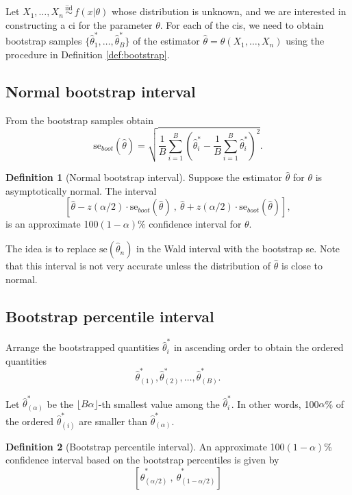 \documentclass[
]{book}
\newcommand{\iid}{\,\overset{\text{iid}}{\sim}\,}
\theoremstyle{definition}
\newtheorem{definition}{Definition}[chapter]
\theoremstyle{definition}
\theoremstyle{definition}
\theoremstyle{definition}
\theoremstyle{remark}
\begin{document}
Let \(X_1,\dots,X_n\iid f(x|\theta)\) whose distribution is unknown, and we are interested in constructing a ci for the parameter \(\theta\).
For each of the cis, we need to obtain bootstrap samples \(\{\hat\theta^*_1,\dots,\hat\theta^*_B\}\) of the estimator \(\hat\theta=\theta(X_1,\dots,X_n)\) using the procedure in Definition \ref{def:bootstrap}.

\hypertarget{normal-bootstrap-interval}{%
\subsection{Normal bootstrap interval}\label{normal-bootstrap-interval}}

From the bootstrap samples obtain
\[
\text{se}_{boot}(\hat\theta) = \sqrt{\frac{1}{B} \sum_{i=1}^B \left(\hat\theta^*_i - \frac{1}{B}\sum_{i=1}^B \hat\theta^*_i \right)^2}.
\]

\begin{definition}[Normal bootstrap interval]
Suppose the estimator \(\hat\theta\) for \(\theta\) is asymptotically normal.
The interval
\[
\left[\hat\theta - z(\alpha/2)\cdot \text{se}_{boot}(\hat\theta) \ , \  \hat\theta + z(\alpha/2)\cdot  \text{se}_{boot}(\hat\theta) \right],
\]
is an approximate 100\((1-\alpha)\)\% confidence interval for \(\theta\).
\end{definition}

The idea is to replace \(\text{se}(\hat\theta_n)\) in the Wald interval with the bootstrap se. Note that this interval is not very accurate unless the distribution of \(\hat\theta\) is close to normal.

\hypertarget{bootstrap-percentile-interval}{%
\subsection{Bootstrap percentile interval}\label{bootstrap-percentile-interval}}

Arrange the bootstrapped quantities \(\hat\theta_i^*\) in ascending order to obtain the ordered quantities
\[
\hat\theta_{(1)}^*, \hat\theta_{(2)}^*, \dots, \hat\theta_{(B)}^*.
\]

Let \(\hat\theta^*_{(\alpha)}\) be the \(\lfloor B\alpha \rfloor\)-th smallest value among the \(\hat\theta_i^*\). In other words, 100\(\alpha\)\% of the ordered \(\hat\theta_{(i)}^*\) are smaller than \(\hat\theta^*_{(\alpha)}\).

\begin{definition}[Bootstrap percentile interval]
An approximate 100\((1-\alpha)\)\% confidence interval based on the bootstrap percentiles is given by
\[
\left[\hat\theta^*_{(\alpha/2)} \ , \ \hat\theta^*_{(1-\alpha/2)}\right]
\]
\end{definition}
\end{document}

